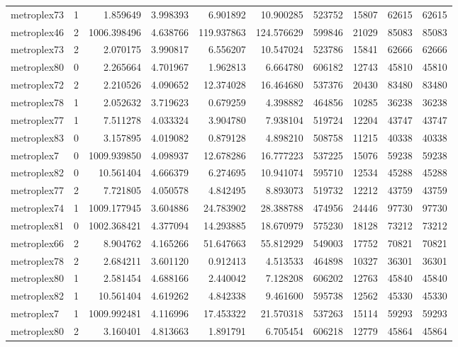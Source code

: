 \documentclass[../../../thesis.tex]{subfiles}
\begin{document}
\begin{longtable}{|l|r|r|r|r|r|r|r|r|r|}
metroplex73 & 1 & 1.859649 & 3.998393 & 6.901892 & 10.900285 & 523752 & 15807 & 62615 & 62615 \\
metroplex46 & 2 & 1006.398496 & 4.638766 & 119.937863 & 124.576629 & 599846 & 21029 & 85083 & 85083 \\
metroplex73 & 2 & 2.070175 & 3.990817 & 6.556207 & 10.547024 & 523786 & 15841 & 62666 & 62666 \\
metroplex80 & 0 & 2.265664 & 4.701967 & 1.962813 & 6.664780 & 606182 & 12743 & 45810 & 45810 \\
metroplex72 & 2 & 2.210526 & 4.090652 & 12.374028 & 16.464680 & 537376 & 20430 & 83480 & 83480 \\
metroplex78 & 1 & 2.052632 & 3.719623 & 0.679259 & 4.398882 & 464856 & 10285 & 36238 & 36238 \\
metroplex77 & 1 & 7.511278 & 4.033324 & 3.904780 & 7.938104 & 519724 & 12204 & 43747 & 43747 \\
metroplex83 & 0 & 3.157895 & 4.019082 & 0.879128 & 4.898210 & 508758 & 11215 & 40338 & 40338 \\
metroplex7 & 0 & 1009.939850 & 4.098937 & 12.678286 & 16.777223 & 537225 & 15076 & 59238 & 59238 \\
metroplex82 & 0 & 10.561404 & 4.666379 & 6.274695 & 10.941074 & 595710 & 12534 & 45288 & 45288 \\
metroplex77 & 2 & 7.721805 & 4.050578 & 4.842495 & 8.893073 & 519732 & 12212 & 43759 & 43759 \\
metroplex74 & 1 & 1009.177945 & 3.604886 & 24.783902 & 28.388788 & 474956 & 24446 & 97730 & 97730 \\
metroplex81 & 0 & 1002.368421 & 4.377094 & 14.293885 & 18.670979 & 575230 & 18128 & 73212 & 73212 \\
metroplex66 & 2 & 8.904762 & 4.165266 & 51.647663 & 55.812929 & 549003 & 17752 & 70821 & 70821 \\
metroplex78 & 2 & 2.684211 & 3.601120 & 0.912413 & 4.513533 & 464898 & 10327 & 36301 & 36301 \\
metroplex80 & 1 & 2.581454 & 4.688166 & 2.440042 & 7.128208 & 606202 & 12763 & 45840 & 45840 \\
metroplex82 & 1 & 10.561404 & 4.619262 & 4.842338 & 9.461600 & 595738 & 12562 & 45330 & 45330 \\
metroplex7 & 1 & 1009.992481 & 4.116996 & 17.453322 & 21.570318 & 537263 & 15114 & 59293 & 59293 \\
metroplex80 & 2 & 3.160401 & 4.813663 & 1.891791 & 6.705454 & 606218 & 12779 & 45864 & 45864 \\

\end{longtable}
\end{document}
